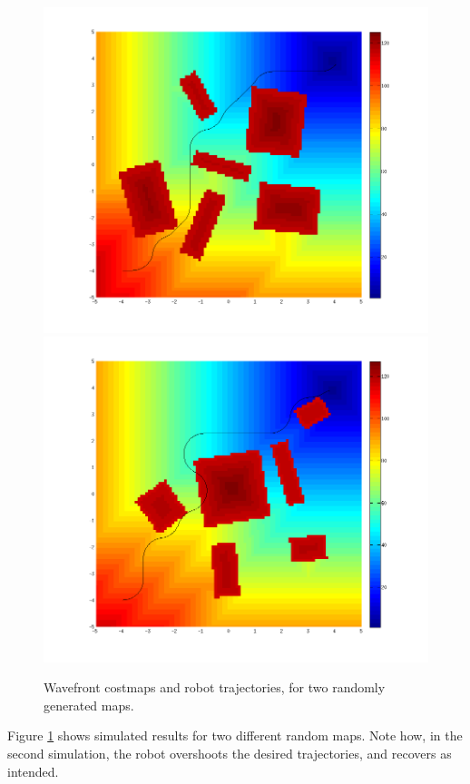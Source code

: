 \documentclass[11pt]{article} %
\begin{document}
\begin{figure}
 \centering
 \includegraphics[scale=0.45]{wavefront_good.png}
 \includegraphics[scale=0.45]{wavefront_kinematic_fail.png}
 \caption{Wavefront costmaps and robot trajectories, for two randomly generated maps.}
 \label{wave_sim}
\end{figure}

Figure \ref{wave_sim} shows simulated results for two different random maps.  Note how, in the second simulation, the robot overshoots the desired trajectories, and recovers as intended.
\end{document}
